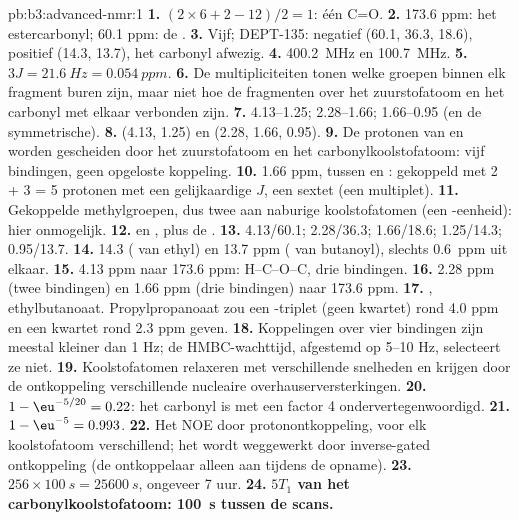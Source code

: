 \begin{solution}{pb:b3:advanced-nmr:1}
\textbf{1.} $(2 \times 6 + 2 - 12)/2 = 1$: één C=O.
\textbf{2.} 173.6 ppm: het estercarbonyl; 60.1 ppm: de .
\textbf{3.} Vijf; DEPT-135:  negatief (60.1, 36.3, 18.6), 
positief (14.3,
13.7), het carbonyl afwezig.
\textbf{4.} \qty{400.2}{MHz} en \qty{100.7}{MHz}.
\textbf{5.} $3J = \qty{21.6}{Hz} = \qty{0.054}{ppm}$.
\textbf{6.} De multipliciteiten tonen welke groepen binnen elk fragment
buren zijn, maar niet hoe de fragmenten over het zuurstofatoom en het
carbonyl met elkaar verbonden zijn.
\textbf{7.} 4.13--1.25; 2.28--1.66; 1.66--0.95 (en de symmetrische).
\textbf{8.}  (4.13, 1.25) en  (2.28, 1.66, 0.95).
\textbf{9.} De protonen van  en  worden gescheiden door
het zuurstofatoom en het carbonylkoolstofatoom: vijf bindingen, geen
opgeloste koppeling.
\textbf{10.} 1.66 ppm, tussen  en : gekoppeld met 2 + 3 = 5
protonen met een gelijkaardige $J$, een sextet (een multiplet).
\textbf{11.} Gekoppelde methylgroepen, dus twee  aan naburige
koolstofatomen (een -eenheid): hier onmogelijk.
\textbf{12.}  en , plus de .
\textbf{13.} 4.13/60.1; 2.28/36.3; 1.66/18.6; 1.25/14.3; 0.95/13.7.
\textbf{14.} 14.3 ( van ethyl) en 13.7 ppm ( van butanoyl),
slechts \qty{0.6}{ppm} uit elkaar.
\textbf{15.} 4.13 ppm naar 173.6 ppm: H--C--O--C, drie bindingen.
\textbf{16.} 2.28 ppm (twee bindingen) en 1.66 ppm (drie bindingen) naar 173.6 ppm.
\textbf{17.} , ethylbutanoaat. Propylpropanoaat
zou een -triplet (geen kwartet) rond 4.0 ppm en een kwartet rond
2.3 ppm geven.
\textbf{18.} Koppelingen over vier bindingen zijn meestal kleiner dan 1 Hz;
de HMBC-wachttijd, afgestemd op 5--10 Hz, selecteert ze niet.
\textbf{19.} Koolstofatomen relaxeren met verschillende snelheden en
krijgen door de ontkoppeling verschillende nucleaire
overhauserversterkingen.
\textbf{20.} $1 - \eu^{-5/20} = 0.22$: het carbonyl is met een factor 4
ondervertegenwoordigd.
\textbf{21.} $1 - \eu^{-5} = 0.993$.
\textbf{22.} Het NOE door protonontkoppeling, voor elk koolstofatoom
verschillend; het wordt weggewerkt door inverse-gated ontkoppeling (de
ontkoppelaar alleen aan tijdens de opname).
\textbf{23.} $256 \times \qty{100}{s} = \qty{25600}{s}$, ongeveer 7 uur.
\textbf{24.} \textbf{$5T_1$ van het carbonylkoolstofatoom: \qty{100}{s}
tussen de scans.}
\end{solution}
